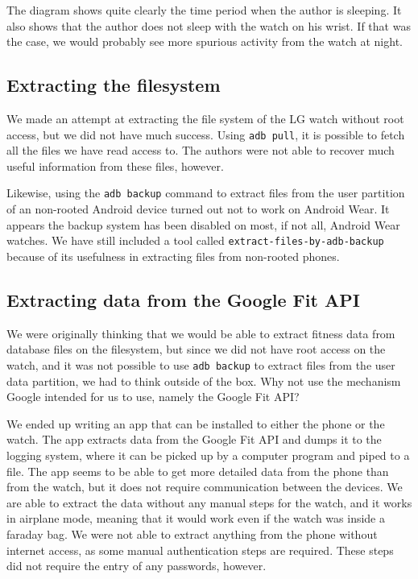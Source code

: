 \documentclass[a4paper,11pt,dvips]{article}
\begin{document}
The diagram shows quite clearly the time period when the author is sleeping. It also shows that the author does not sleep with the watch on his wrist. If that was the case, we would probably see more spurious activity from the watch at night.


\subsection{Extracting the filesystem}

We made an attempt at extracting the file system of the LG watch without root access, but we did not have much success. Using \texttt{adb pull}, it is possible to fetch all the files we have read access to. The authors were not able to recover much useful information from these files, however.

Likewise, using the \texttt{adb backup} command to extract files from the user partition of an non-rooted Android device turned out not to work on Android Wear. It appears the backup system has been disabled on most, if not all, Android Wear watches. We have still included a tool called \texttt{extract-files-by-adb-backup} because of its usefulness in extracting files from non-rooted phones.


\subsection{Extracting data from the Google Fit API}

We were originally thinking that we would be able to extract fitness data from database files on the filesystem, but since we did not have root access on the watch, and it was not possible to use \texttt{adb backup} to extract files from the user data partition, we had to think outside of the box. Why not use the mechanism Google intended for us to use, namely the Google Fit API?

We ended up writing an app that can be installed to either the phone or the watch. The app extracts data from the Google Fit API and dumps it to the logging system, where it can be picked up by a computer program and piped to a file. The app seems to be able to get more detailed data from the phone than from the watch, but it does not require communication between the devices. We are able to extract the data without any manual steps for the watch, and it works in airplane mode, meaning that it would work even if the watch was inside a faraday bag. We were not able to extract anything from the phone without internet access, as some manual authentication steps are required. These steps did not require the entry of any passwords, however.
\end{document}
